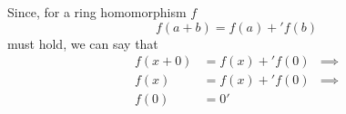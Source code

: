 Since, for a ring homomorphism \(f\)
\begin{displaymath}
    f(a + b) = f(a) +' f(b)
\end{displaymath}
must hold, we can say that
\begin{displaymath}
    \begin{aligned}
        f(x + 0) &= f(x) +' f(0) & \implies \\
        f(x) &= f(x) +' f(0) & \implies \\
        f(0) &= 0'
    \end{aligned}
\end{displaymath}